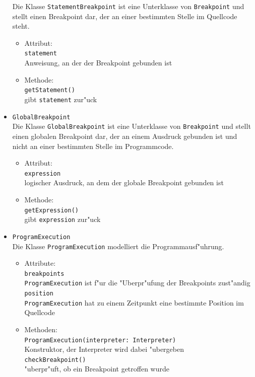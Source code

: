 \documentclass[10pt,a4paper,titlepage]{article}
\begin{document}
\begin{itemize}
Die Klasse \texttt{StatementBreakpoint} ist eine Unterklasse von \texttt{Breakpoint} und stellt einen Breakpoint dar, der an einer bestimmten Stelle im Quellcode steht. 
\begin{itemize}
\item Attribut: \\
\texttt{statement} \\
Anweisung, an der der Breakpoint gebunden ist
\item Methode: \\
\texttt{getStatement()} \\
gibt \texttt{statement} zur"uck
\end{itemize}
\item \texttt{GlobalBreakpoint} \\
Die Klasse \texttt{GlobalBreakpoint} ist eine Unterklasse von \texttt{Breakpoint} und stellt einen globalen Breakpoint dar, der an einem Ausdruck gebunden ist und nicht an einer bestimmten Stelle im Programmcode. 
\begin{itemize}
\item Attribut: \\
\texttt{expression} \\
logischer Ausdruck, an dem der globale Breakpoint gebunden ist
\item Methode: \\
\texttt{getExpression()} \\
gibt \texttt{expression} zur"uck 
\end{itemize}
\item \texttt{ProgramExecution} \\
Die Klasse \texttt{ProgramExecution} modelliert die Programmausf"uhrung.
\begin{itemize}
\item Attribute: \\
\texttt{breakpoints} \\
\texttt{ProgramExecution} ist f"ur die "Uberpr"ufung der Breakpoints zust"andig \\
\texttt{position} \\
\texttt{ProgramExecution} hat zu einem Zeitpunkt eine bestimmte Position im Quellcode 
\item Methoden: \\
\texttt{ProgramExecution(interpreter: Interpreter)} \\
Konstruktor, der Interpreter wird dabei "ubergeben \\
\texttt{checkBreakpoint()} \\
"uberpr"uft, ob ein Breakpoint getroffen wurde \\

\end{itemize}
\end{itemize}
\end{document}
